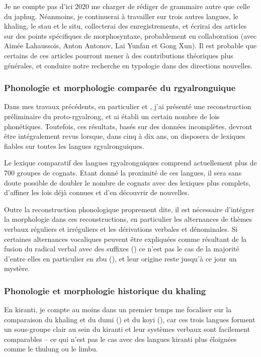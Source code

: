 \documentclass[oldfontcommands,oneside,a4paper,11pt]{article}
\begin{document}
Je ne compte pas d'ici 2020 me charger de rédiger de grammaire autre que celle du japhug. Néanmoins, je continuerai à travailler sur trois autres langues, le khaling, le stau et le situ, collecterai des enregistrements, et écrirai des articles sur des points spécifiques de morphosyntaxe, probablement en collaboration (avec Aimée Lahaussois, Anton Antonov, Lai Yunfan et Gong Xun). Il est probable que certains de ces articles pourront mener à des contributions théoriques plus générales, et conduire notre recherche en typologie dans des directions nouvelles.


\subsubsection{Phonologie et morphologie comparée du rgyalronguique} \label{sec:comparee.rgy}
Dans mes travaux précédents, en particulier \citet{jacques04these} et \citet{jacques14esquisse}, j'ai présenté une reconstruction préliminaire du proto-rgyalrong, et ai établi un certain nombre de lois phonétiques. Toutefois, ces résultats, basés sur des données incomplètes, devront être intégralement revus lorsque, dans cinq à dix ans, on disposera de lexiques fiables sur toutes les langues rgyalronguiques.

Le lexique comparatif des langues rgyalronguiques comprend actuellement plus de 700 groupes de cognats. Etant donné la proximité de ces langues, il sera sans doute possible de doubler le nombre de cognats avec des lexiques plus complets,  d'affiner les lois déjà connues et d'en découvrir de nouvelles. 

Outre la reconstruction phonologique proprement dite, il est nécessaire d'intégrer la morphologie dans ces reconstructions, en particulier les alternances de thèmes verbaux réguliers et irréguliers et les dérivations verbales et dénominales. Si certaines alternances vocaliques peuvent être expliquées comme résultant de la fusion du radical verbal avec des suffixes (\citealt[357-8]{jacques04these}) ce n'est pas le cas de la majorité d'entre elles en particulier en zbu (\citealt{jackson04showu}), et leur origine reste jusqu'à ce jour un mystère.

\subsubsection{Phonologie et morphologie historique du khaling}
En kiranti, je compte au moins dans un premier temps me focaliser sur la comparaison du khaling et du dumi (\citealt{driem93dumi}) et du koyi (\citealt{lahaussois09}), car ces trois langues forment un sous-groupe clair au sein du kiranti et leur systèmes verbaux sont facilement comparables -- ce qui n'est pas le cas avec des langues kiranti plus éloignées comme le thulung ou le limbu.
\end{document}
